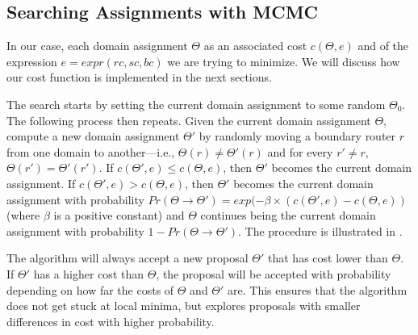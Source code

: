 \subsection{Searching Assignments with MCMC}
In our case, each domain assignment $\Theta$
as an associated cost $c(\Theta, e)$
and of the expression 
$e=expr(rc, sc, bc)$
we are trying to minimize.
We will discuss how our cost function is implemented in the next sections.

The search starts by setting the current domain assignment 
to some random $\Theta_0$.
The following process then repeats.
Given the current domain
assignment $\Theta$, 
compute a new domain assignment $\Theta'$ by randomly
moving a boundary 
router $r$ from one domain to another---i.e., $\Theta(r)\neq \Theta'(r)$ and
for every $r'\neq r$, $\Theta(r')= \Theta'(r')$.
If $c(\Theta',e)\leq c(\Theta,e)$, then $\Theta'$ becomes the current domain assignment.
If $c(\Theta',e)>c(\Theta,e)$, then $\Theta'$ becomes the current domain assignment
with probability $Pr(\Theta \rightarrow \Theta')= exp(-\beta\times(c(\Theta',e) - c(\Theta,e))$ (where $\beta$ is a positive constant) and 
 $\Theta$ continues being the current domain assignment with probability $1-Pr(\Theta \rightarrow \Theta')$.
\iffull
The procedure is illustrated in .
\fi

The algorithm will always accept a new proposal $\Theta'$
that has cost lower than $\Theta$. If $\Theta'$ has a 
higher cost than $\Theta$, the proposal will be 
accepted with probability depending on 
how far the costs of $\Theta$ and $\Theta'$ are. This ensures that 
the algorithm does not get stuck at local minima, but 
explores proposals with smaller differences in cost with 
higher probability.

